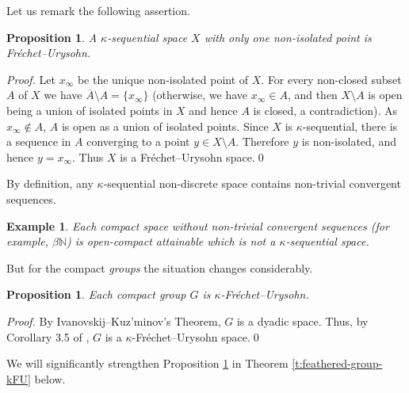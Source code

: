 \documentclass[preprint,11pt]{elsarticle}
\def\de{\delta}
\newtheorem{proposition}[theorem]{Proposition}
\newtheorem{example}[theorem]{Example}
\numberwithin{equation}{section}
\numberwithin{theorem}{section}
\newcommand{\NN}{\mathbb{N}}
\newcommand{\SM}{{\setminus}}
\begin{document}
Let us remark the following assertion.

\begin{proposition} \label{p:1-non-isol-kappa-sequential}
A $\kappa$-sequential space  $X$ with only one non-isolated point is Fr\'{e}chet--Urysohn.
\end{proposition}

\begin{proof}
Let $x_\infty$ be the unique non-isolated point of $X$. For every non-closed subset $A$ of $X$ we have $\overline{A}\SM A=\{x_\infty\}$ (otherwise, we have $x_\infty\in A$, and then $X\SM A$ is open being a union of isolated points in $X$ and hence $A$ is closed, a contradiction). As  $x_\infty\not\in A$, $A$ is open as a union of isolated points. Since $X$ is $\kappa$-sequential, there is a sequence in $A$ converging to a point $y\in X\SM A$. Therefore $y$ is non-isolated, and hence $y=x_\infty$. Thus $X$ is a  Fr\'{e}chet--Urysohn space.\qed
\end{proof}



By definition, any $\kappa$-sequential non-discrete space contains non-trivial convergent sequences.
\begin{example} \label{exa:bN-kappa-seq}
Each compact space without non-trivial convergent sequences {\rm(}for example,  $\beta\NN${\rm)} is open-compact attainable which is  not a $\kappa$-sequential space.
\end{example}
But for the compact {\em groups} the situation changes considerably.

\begin{proposition} \label{p:compact-group-kFU}
Each compact group $G$ is $\kappa$-Fr\'{e}chet--Urysohn.
\end{proposition}

\begin{proof}
By Ivanovskij--Kuz'minov's Theorem, $G$ is a dyadic space. Thus, by Corollary 3.5 of \cite{LiL}, $G$ is a  $\kappa$-Fr\'{e}chet--Urysohn space.\qed
\end{proof}
We will significantly strengthen Proposition \ref{p:compact-group-kFU} in Theorem \ref{t:feathered-group-kFU} below.




\end{document}
